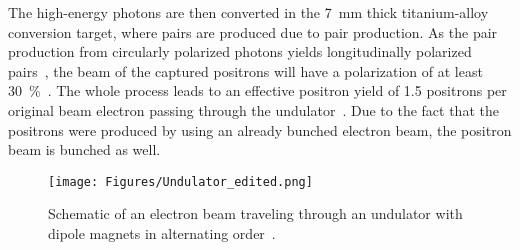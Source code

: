 The high-energy photons are then converted in the \SI{7}{\milli\meter} thick titanium-alloy conversion target, where \positron \electron pairs are produced due to pair production.
As the pair production from circularly polarized photons yields longitudinally polarized \positron \electron pairs~\cite{Polarization}, the beam of the captured positrons will have a polarization of at least \SI{30}{\percent}~\cite[p. 14]{TDR32}.
The whole process leads to an effective positron yield of 1.5 positrons per original beam electron passing through the undulator~\cite{Ushakov}.
Due to the fact that the positrons were produced by using an already bunched electron beam, the positron beam is bunched as well. 
\begin{figure}
\centering
\texttt{[image: Figures/Undulator\_edited.png]}
\caption[Schematic layout of an undulator]{Schematic of an electron beam traveling through an undulator with dipole magnets in alternating order~\cite[based on p. 41]{Wille}.}
\label{fig:Undulator}
\end{figure}

